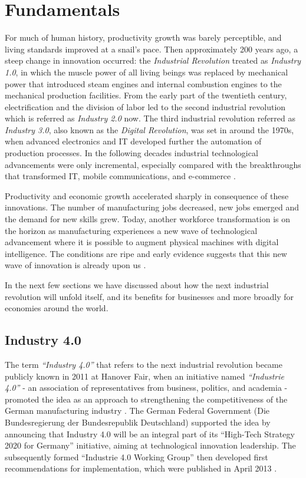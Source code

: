 \chapter{Fundamentals} \label{chap:fundamentals}
For much of human history, productivity growth was barely perceptible, and living standards improved at a snail's pace. Then approximately 200 years ago, a steep change in innovation occurred: the \textit{Industrial Revolution} treated as \textit{Industry 1.0}, in which the muscle power of all living beings was replaced by mechanical power that introduced steam engines and internal combustion engines to the mechanical production facilities. From the early part of the twentieth century, electrification and the division of labor led to the second industrial revolution which is referred as \textit{Industry 2.0} now. The third industrial revolution referred as \textit{Industry 3.0}, also known as the \textit{Digital Revolution}, was set in around the 1970s, when advanced electronics and \acs{IT} developed further the automation of production processes. In the following decades industrial technological advancements were only incremental, especially compared with the breakthroughs that transformed \acs{IT}, mobile communications, and e-commerce \cite{INDUSINTERNET,IN4DESIGN,IN4BCG}.

Productivity and economic growth accelerated sharply in consequence of these innovations. The number of manufacturing jobs decreased, new jobs emerged and the demand for new skills grew. Today, another workforce transformation is on the horizon as manufacturing experiences a new wave of technological advancement where it is possible to augment physical machines with digital intelligence. The conditions are ripe and early evidence suggests that this new wave of innovation is already upon us \cite{INDUSINTERNET,MANMACHINE}.

In the next few sections we have discussed about how the next industrial revolution will unfold itself, and its benefits for businesses and more broadly for economies around the world.
\section{Industry 4.0} \label{ind4}
The term \textit{“Industry 4.0”} that refers to the next industrial revolution became publicly known in 2011 at Hanover Fair, when an initiative named \textit{“Industrie 4.0”} - an association of representatives from business, politics, and academia - promoted the idea as an approach to strengthening the competitiveness of the German manufacturing industry \cite{VDINACH}. The German Federal Government (Die Bundesregierung der Bundesrepublik Deutschland) supported the idea by announcing that Industry 4.0 will be an integral part of its “High-Tech Strategy 2020 for Germany” initiative, aiming at technological innovation leadership. The subsequently formed “Industrie 4.0 Working Group” then developed first recommendations for implementation, which were published in April 2013 \cite{IN4DESIGN}.

